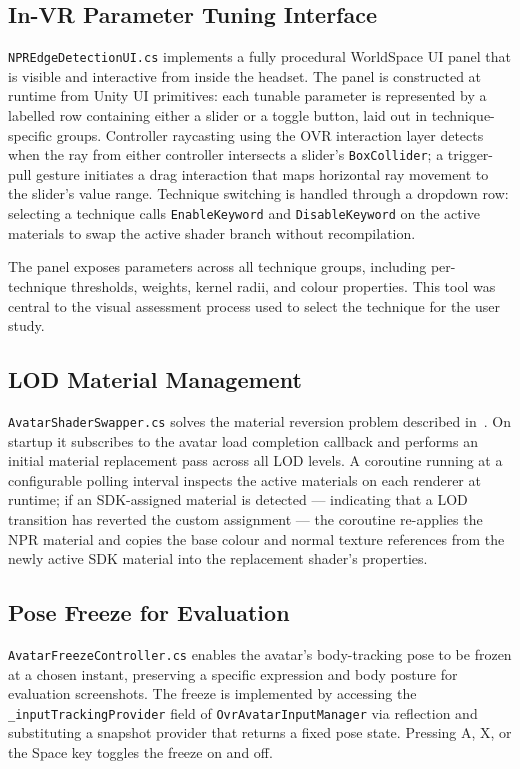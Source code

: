 \subsection{In-VR Parameter Tuning Interface}
\label{sec:impl_ui}

\texttt{NPREdgeDetectionUI.cs} implements a fully procedural WorldSpace UI panel that is visible and interactive from inside the headset. The panel is constructed at runtime from Unity UI primitives: each tunable parameter is represented by a labelled row containing either a slider or a toggle button, laid out in technique-specific groups. Controller raycasting using the OVR interaction layer detects when the ray from either controller intersects a slider's \texttt{BoxCollider}; a trigger-pull gesture initiates a drag interaction that maps horizontal ray movement to the slider's value range. Technique switching is handled through a dropdown row: selecting a technique calls \texttt{EnableKeyword} and \texttt{DisableKeyword} on the active materials to swap the active shader branch without recompilation.

The panel exposes parameters across all technique groups, including per-technique thresholds, weights, kernel radii, and colour properties. This tool was central to the visual assessment process used to select the technique for the user study.

\subsection{LOD Material Management}
\label{sec:impl_swapper}

\texttt{AvatarShaderSwapper.cs} solves the material reversion problem described in~. On startup it subscribes to the avatar load completion callback and performs an initial material replacement pass across all LOD levels. A coroutine running at a configurable polling interval inspects the active materials on each renderer at runtime; if an SDK-assigned material is detected — indicating that a LOD transition has reverted the custom assignment — the coroutine re-applies the NPR material and copies the base colour and normal texture references from the newly active SDK material into the replacement shader's properties.

\subsection{Pose Freeze for Evaluation}
\label{sec:impl_freeze}

\texttt{AvatarFreezeController.cs} enables the avatar's body-tracking pose to be frozen at a chosen instant, preserving a specific expression and body posture for evaluation screenshots. The freeze is implemented by accessing the \texttt{\_inputTrackingProvider} field of \texttt{OvrAvatarInputManager} via reflection and substituting a snapshot provider that returns a fixed pose state. Pressing A, X, or the Space key toggles the freeze on and off.
